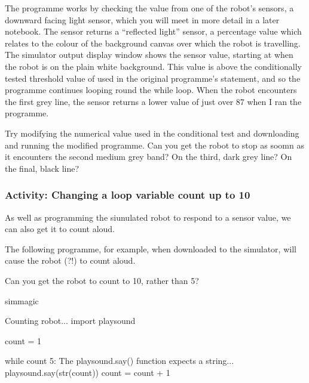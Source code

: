 \documentclass[letterpaper,10pt,english]{sphinxmanual}
\begin{document}
The programme works by checking the value from one of the robot’s sensors, a downward facing light sensor, which you will meet in more detail in a later notebook. The sensor returns a “reflected light” sensor, a percentage value which relates to the colour of the background canvas over which the robot is travelling. The simulator output display window shows the sensor value, starting at  when the robot is on the plain white background. This value is above the conditionally tested
threshold value of  used in the original programme’s  statement, and so the programme continues looping round the while loop. When the robot encounters the first grey line, the sensor returns a lower value of just over 87 when I ran the programme.


Try modifying the numerical value used in the  conditional test and downloading and running the modified programme. Can you get the robot to stop as soomn as it encounters the second medium grey band? On the third, dark grey line? On the final, black line?


\subsubsection{Activity: Changing a loop variable count up to 10}
\label{\detokenize{content/02_Robot_Lab/Section_00_01:Activity:-Changing-a-loop-variable-count-up-to-10}}
As well as programming the siunulated robot to respond to a sensor value, we can also get it to count aloud.

The following programme, for example, when downloaded to the simulator, will cause the robot (?!) to count aloud.

Can you get the robot to count to 10, rather than 5?

{
\begin{sphinxVerbatim}[commandchars=\\\{\}]
\llap{\color{nbsphinxin}[ ]:\,\hspace{\fboxrule}\hspace{\fboxsep}}\PYGZpc{}\PYGZpc{}sim\PYGZus{}magic

\PYGZsh{}Counting robot...
import playsound

count = 1

while count \PYGZlt{} 5:
    \PYGZsh{} The playsound.say() function expects a string...
    playsound.say(str(count))
    count = count + 1
\end{sphinxVerbatim}
}
\end{document}
